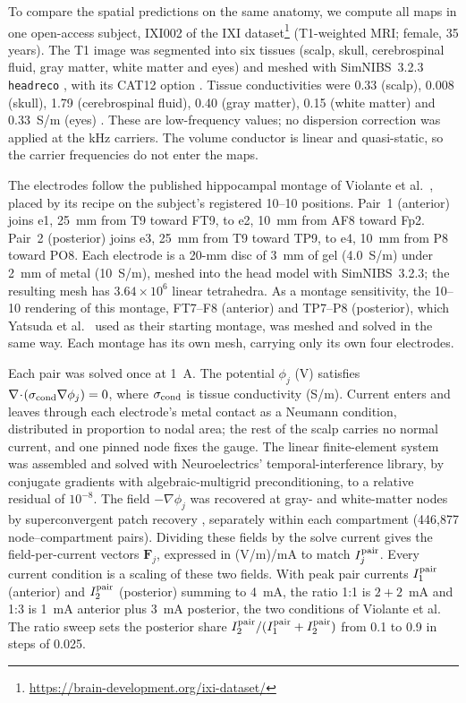 To compare the spatial predictions on the same anatomy, we compute all maps
in one open-access subject,
IXI002 of the IXI dataset\footnote{\url{https://brain-development.org/ixi-dataset/}}
(T1-weighted MRI; female, 35 years). The T1 image was segmented into six tissues
(scalp, skull, cerebrospinal fluid, gray matter, white matter and eyes) and meshed with
SimNIBS~3.2.3 \texttt{headreco} \cite{nielsen2018}, with its CAT12 option
\cite{gaser2024}. Tissue conductivities were 0.33 (scalp), 0.008 (skull), 1.79
(cerebrospinal fluid), 0.40 (gray matter), 0.15 (white matter) and 0.33~S/m (eyes)
\cite{salvador2025}. These are low-frequency values; no dispersion correction was
applied at the kHz carriers. The volume conductor is linear and quasi-static, so the
carrier frequencies do not enter the maps.

The electrodes follow the published hippocampal montage of Violante et al.\
\cite{violante2023}, placed by its recipe on the subject's registered 10--10
positions. Pair~1 (anterior) joins e1, 25~mm from T9 toward FT9, to e2, 10~mm from AF8
toward Fp2. Pair~2 (posterior) joins e3, 25~mm from T9 toward TP9, to e4, 10~mm from P8
toward PO8. Each electrode is a 20-mm disc of 3~mm of gel (4.0~S/m) under 2~mm of metal
(10~S/m), meshed into the head model with SimNIBS~3.2.3; the resulting mesh has
$3.64\times10^6$ linear tetrahedra. As a montage sensitivity, the 10--10 rendering of
this montage, FT7--F8 (anterior) and TP7--P8 (posterior), which Yatsuda et al.\
\cite{yatsuda2024} used as their starting montage, was meshed and solved in the same
way. Each montage has its own mesh, carrying only its own four electrodes.

Each pair was solved once at 1~A. The potential $\phi_j$ (V) satisfies
$\nabla\!\cdot\!(\sigma_{\rm cond}\nabla\phi_j)=0$, where
$\sigma_{\rm cond}$ is tissue conductivity (S/m). Current enters and leaves through each
electrode's metal contact as a Neumann condition, distributed in proportion to nodal
area; the rest of the scalp carries no normal current, and one pinned node fixes the
gauge. The linear finite-element system was assembled and solved with Neuroelectrics'
temporal-interference library, by conjugate gradients with algebraic-multigrid
preconditioning, to a relative residual of $10^{-8}$. The field
$-\nabla\phi_j$ was recovered at gray- and white-matter
nodes by superconvergent patch recovery \cite{zienkiewicz1992}, separately within each
compartment (446{,}877 node--compartment pairs). Dividing these fields by the solve
current gives the field-per-current vectors $\mathbf F_j$, expressed in
(V/m)/mA to match $I_j^{\rm pair}$. Every current condition is a scaling of these two fields.
With peak pair currents $I_1^{\rm pair}$ (anterior) and
$I_2^{\rm pair}$ (posterior) summing to 4~mA, the ratio 1:1 is $2+2$~mA and 1:3 is
1~mA anterior plus 3~mA posterior, the two conditions of Violante et al. The ratio sweep
sets the posterior share $I_2^{\rm pair}/(I_1^{\rm pair}+I_2^{\rm pair})$ from 0.1 to
0.9 in steps of 0.025.

